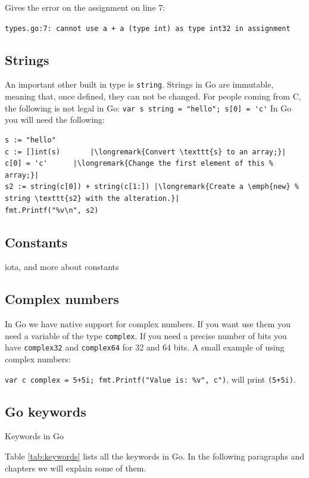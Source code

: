 
Gives the error on the assignment on line 7:

\noindent\lstinline{types.go:7: cannot use a + a (type int) as type int32 in assignment}

\subsection{Strings}
An important other built in type is \lstinline{string}. Strings in Go are
immutable, meaning that, once defined, they can not be changed. For
people coming from C, the following is not legal in Go:
\lstinline{var s string = "hello"; s[0] = 'c'} 
In Go you will need the following:
\begin{lstlisting}
s := "hello"
c := []int(s)	    |\longremark{Convert \texttt{s} to an array;}|
c[0] = 'c'	    |\longremark{Change the first element of this %
array;}|
s2 := string(c[0]) + string(c[1:]) |\longremark{Create a \emph{new} %
string \texttt{s2} with the alteration.}|
fmt.Printf("%v\n", s2)
\end{lstlisting}

\showremarks

\subsection{Constants}
iota, and more about constants

\subsection{Complex numbers}
In Go we have native support for complex numbers. If you 
want use them you need a variable of the type \lstinline{complex}. If
you need a precise number of bits you have \lstinline{complex32} and
\lstinline{complex64} for 32 and 64 bits. A small example of using complex numbers:

\lstinline{var c complex = 5+5i; fmt.Printf("Value is: %v", c")}, will
print \lstinline{(5+5i)}.

\subsection{Go keywords}
\begin{table}[H]
\begin{center}
\caption{Keywords in Go}
\label{tab:keywords}

\end{center}
\end{table}
Table \ref{tab:keywords} lists all the keywords in Go.
In the following paragraphs and chapters we will explain some of
them. 

